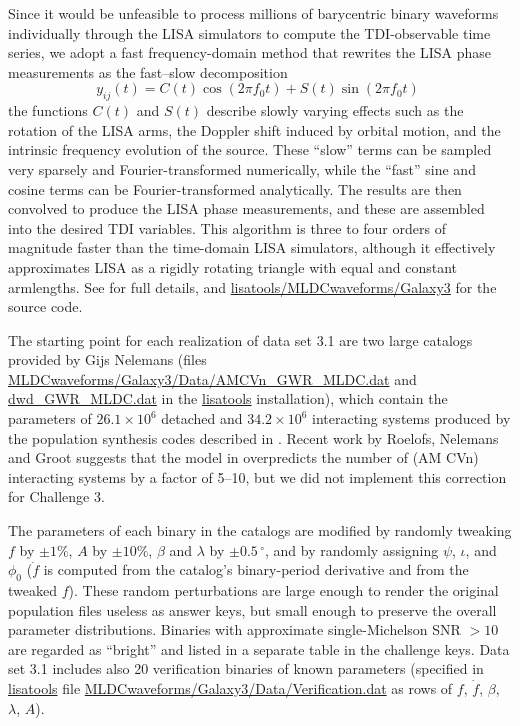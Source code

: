 \documentclass{iopart}
\begin{document}
Since it would be unfeasible to process millions of barycentric binary waveforms individually through the LISA simulators to compute the TDI-observable time series, we adopt a fast frequency-domain method \cite{Cornish:2007if} that rewrites the LISA phase measurements as the fast--slow decomposition
%
\begin{equation}
y_{ij}(t) = C(t) \cos(2 \pi f_0 t) + S(t) \sin(2 \pi f_0 t) \;
\end{equation}
%
the functions $C(t)$ and $S(t)$ describe slowly varying effects such as the rotation of the LISA arms, the Doppler shift induced by orbital motion, and the intrinsic frequency evolution of the source. These ``slow'' terms can be sampled very sparsely and Fourier-transformed numerically, while the ``fast'' sine and cosine terms can be Fourier-transformed analytically. The results are then convolved to produce the LISA phase measurements, and these are assembled into the desired TDI variables. This algorithm is three to four orders of magnitude faster than the time-domain LISA simulators, although it effectively approximates LISA as a rigidly rotating triangle with equal and constant armlengths. See \cite{Cornish:2007if} for full details, and \url{lisatools/MLDCwaveforms/Galaxy3} for the source code.

The starting point for each realization of data set 3.1 are two large catalogs provided by Gijs Nelemans (files \url{MLDCwaveforms/Galaxy3/Data/AMCVn_GWR_MLDC.dat} and \url{dwd_GWR_MLDC.dat} in the \url{lisatools} installation), which contain the parameters of $26.1 \times 10^6$ detached and $34.2 \times 10^6$ interacting systems produced by the population synthesis codes described in \cite{Nelemans:2001hp, Nelemans:2003ha}. Recent work by Roelofs, Nelemans and Groot \cite{Roelofs:2007rn} suggests that the model in \cite{Nelemans:2003ha} overpredicts the number of (AM CVn) interacting systems by a factor of 5--10, but we did not implement this correction for Challenge 3.

The parameters of each binary in the catalogs are modified by randomly tweaking $f$ by $\pm 1\%$, $A$ by $\pm 10\%$, $\beta$ and $\lambda$ by $\pm 0.5\, {}^\circ$, and by randomly assigning $\psi$, $\iota$, and $\phi_0$ ($\dot{f}$ is computed from the catalog's binary-period derivative and from the tweaked $f$). These random perturbations are large enough to render the original population files useless as answer keys, but small enough to preserve the overall parameter distributions. Binaries with approximate single-Michelson SNR $> 10$ are regarded as ``bright'' and listed in a separate table in the challenge keys. Data set 3.1 includes also 20 verification binaries of known parameters (specified in \url{lisatools} file \url{MLDCwaveforms/Galaxy3/Data/Verification.dat} as rows of $f$, $\dot{f}$, $\beta$, $\lambda$, $A$).
\end{document}
